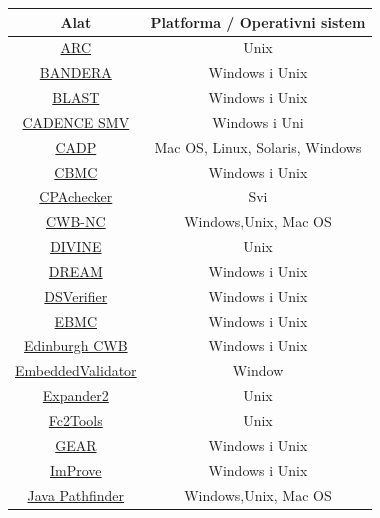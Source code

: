 \documentclass[a4paper]{article}
\begin{document}
{\begin{table}
\begin{center}
 \begin{tabular}{||c c ||} 
 \hline
 \textbf{Alat}  & \textbf{Platforma / Operativni sistem} \\ [0.5ex] 
 \hline\hline
 \href{https://altarica.labri.fr/wp/} {ARC} & Unix \\ 
 \hline
 \href{http://bandera.projects.cs.ksu.edu/} {BANDERA} & Windows i Unix  \\
 \hline
 \href{https://en.wikipedia.org/wiki/BLAST_model_checker/} {BLAST}  & Windows i Unix  \\
 \hline
 \href{http://www.kenmcmil.com/smv.html} {CADENCE SMV} & Windows i Uni  \\
 \hline
 \href{https://en.wikipedia.org/wiki/Construction_and_Analysis_of_Distributed_Processes} {CADP} & Mac OS, Linux, Solaris, Windows  \\
  \hline
 \href{http://www.cprover.org/cbmc/} {CBMC} & Windows i Unix \\ 
  \hline
 \href{https://cpachecker.sosy-lab.org/} {CPAchecker} & Svi \\ 
  \hline
 \href{http://www3.cs.stonybrook.edu/~cwb/} {CWB-NC} & Windows,Unix, Mac OS \\ 
  \hline
 \href{http://divine.fi.muni.cz/} {DIVINE} & Unix \\ 
  \hline
 \href{https://en.wikipedia.org/wiki/DREAM_(software)} {DREAM} & Windows i Unix \\ 
  \hline
 \href{http://dsverifier.org/} {DSVerifier} & Windows i Unix \\ 
   \hline
 \href{http://www.cprover.org/ebmc/} {EBMC} & Windows i Unix \\ 
   \hline
 \href{http://homepages.inf.ed.ac.uk/perdita/cwb/} {Edinburgh CWB} & Windows i Unix \\ 
   \hline
 \href{https://www.btc-es.de/en/} {EmbeddedValidator} & Window \\ 
   \hline
 \href{https://fldit-www.cs.uni-dortmund.de/~peter/ExpNeu/Welcome.html} {Expander2} & Unix \\ 
   \hline
 \href{http://www-sop.inria.fr/meije/verification/} {Fc2Tools} &  Unix \\ 
   \hline
 \href{http://jabc.cs.tu-dortmund.de/modelchecking/} {GEAR} & Windows i Unix \\ 
   \hline
 \href{https://github.com/tomahawkins/improve/wiki/ImProve} {ImProve} & Windows i Unix \\ 
   \hline
 \href{https://en.wikipedia.org/wiki/Java_Pathfinder} {Java Pathfinder} &  Windows,Unix, Mac OS \\ 

\end{tabular}
\end{center}
\end{table}}
\end{document}
